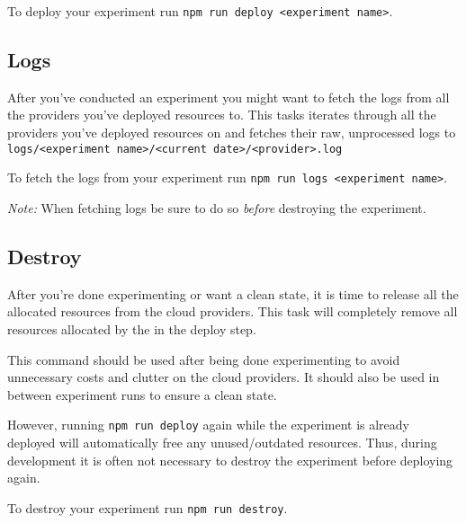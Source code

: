 \documentclass[../main.tex]{subfiles}
\begin{document}
To deploy your experiment run \texttt{npm run deploy <experiment name>}.

\subsection{Logs}\label{sec:logs}
After you've conducted an experiment you might want to fetch the logs 
from all the providers you've deployed resources to. 
This tasks iterates through all the providers you've deployed resources on and fetches their raw, 
unprocessed logs to \texttt{logs/<experiment name>/<current date>/<provider>.log}

To fetch the logs from your experiment run \texttt{npm run logs <experiment name>}.

\textit{Note:} When fetching logs be sure to do so \textit{before} destroying the experiment.

\subsection{Destroy}\label{sec:destroy}
After you're done experimenting or want a clean state, 
it is time to release all the allocated resources from the cloud providers.
This task will completely remove all resources allocated by the in the deploy step. 

This command should be used after being done experimenting to avoid unnecessary costs 
and clutter on the cloud providers.
It should also be used in between experiment runs to ensure a clean state.

However, running \texttt{npm run deploy} again while the experiment is already deployed will 
automatically free any unused/outdated resources.
Thus, during development it is often not necessary to destroy the experiment before deploying again.

To destroy your experiment run \texttt{npm run destroy}.
\end{document}
